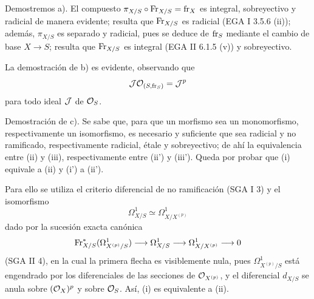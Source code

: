Demostremos a). El compuesto $\pi_{X/S}\circ\operatorname{Fr}_{X/S}=\operatorname{fr}_X$ es integral, sobreyectivo y radicial de manera evidente; resulta que $\operatorname{Fr}_{X/S}$ es radicial (EGA I 3.5.6 (ii)); además, $\pi_{X/S}$ es separado y radicial, pues se deduce de $\operatorname{fr}_S$ mediante el cambio de base $X\to S$; resulta que $\operatorname{Fr}_{X/S}$ es integral (EGA II 6.1.5 (v)) y sobreyectivo.

La demostración de b) es evidente, observando que
\[
\mathcal J\mathcal{O}_{(S,\operatorname{fr}_S)}=\mathcal J^p
\]
para todo ideal $\mathcal J$ de $\mathcal{O}_S$.

Demostración de c). Se sabe que, para que un morfismo sea un monomorfismo, respectivamente un isomorfismo, es necesario y suficiente que sea radicial y no ramificado, respectivamente radicial, étale y sobreyectivo; de ahí la equivalencia entre (ii) y (iii), respectivamente entre (ii') y (iii'). Queda por probar que (i) equivale a (ii) y (i') a (ii').

Para ello se utiliza el criterio diferencial de no ramificación (SGA I 3) y el isomorfismo
\[
\Omega^1_{X/S}\simeq \Omega^1_{X/X^{(p)}}
\]
dado por la sucesión exacta canónica
\[
\operatorname{Fr}_{X/S}^*(\Omega^1_{X^{(p)}/S})\longrightarrow \Omega^1_{X/S}
\longrightarrow \Omega^1_{X/X^{(p)}}\longrightarrow 0
\]
(SGA II 4), en la cual la primera flecha es visiblemente nula, pues $\Omega^1_{X^{(p)}/S}$ está engendrado por los diferenciales de las secciones de $\mathcal{O}_{X^{(p)}}$, y el diferencial $d_{X/S}$ se anula sobre $(\mathcal{O}_X)^p$ y sobre $\mathcal{O}_S$. Así, (i) es equivalente a (ii).
